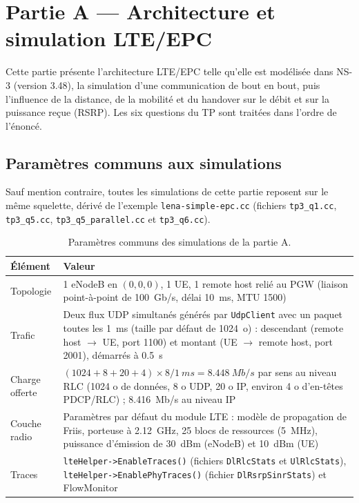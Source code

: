 
\chapter{Partie A --- Architecture et simulation LTE/EPC}

Cette partie présente l'architecture LTE/EPC telle qu'elle est modélisée dans
NS-3 (version 3.48), la simulation d'une communication de bout en bout, puis
l'influence de la distance, de la mobilité et du handover sur le débit et sur la
puissance reçue (RSRP). Les six questions du TP sont traitées dans l'ordre de
l'énoncé.

\section*{Paramètres communs aux simulations}

Sauf mention contraire, toutes les simulations de cette partie reposent sur le
même squelette, dérivé de l'exemple \texttt{lena-simple-epc.cc} (fichiers
\texttt{tp3\_q1.cc}, \texttt{tp3\_q5.cc}, \texttt{tp3\_q5\_parallel.cc} et
\texttt{tp3\_q6.cc}).

\begin{table}[H]
\centering
\caption{Paramètres communs des simulations de la partie A.}
\label{tab:A-params}
\small
\begin{tabularx}{\textwidth}{@{}lY@{}}
\toprule
\textbf{Élément} & \textbf{Valeur} \\
\midrule
Topologie & 1 eNodeB en $(0,0,0)$, 1 UE, 1 remote host relié au PGW
(liaison point-à-point de \SI{100}{Gb/s}, délai \SI{10}{ms}, MTU 1500) \\
Trafic & Deux flux UDP simultanés générés par \texttt{UdpClient} avec un
paquet toutes les \SI{1}{ms} (taille par défaut de \SI{1024}{o}) :
descendant (remote host $\rightarrow$ UE, port 1100) et montant
(UE $\rightarrow$ remote host, port 2001), démarrés à \SI{0.5}{s} \\
Charge offerte & $(1024+8+20+4)\times 8 / \SI{1}{ms} = \SI{8.448}{Mb/s}$
par sens au niveau RLC (1024 o de données, 8 o UDP, 20 o IP, environ 4 o
d'en-têtes PDCP/RLC) ; \SI{8.416}{Mb/s} au niveau IP \\
Couche radio & Paramètres par défaut du module LTE : modèle de propagation
de Friis, porteuse à \SI{2.12}{GHz}, 25 blocs de ressources (\SI{5}{MHz}),
puissance d'émission de \SI{30}{dBm} (eNodeB) et \SI{10}{dBm} (UE) \\
Traces & \texttt{lteHelper->EnableTraces()} (fichiers \texttt{DlRlcStats} et
\texttt{UlRlcStats}), \texttt{lteHelper->EnablePhyTraces()} (fichier
\texttt{DlRsrpSinrStats}) et FlowMonitor \\
\bottomrule
\end{tabularx}
\end{table}

